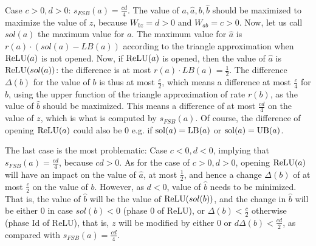 Case $c>0,d>0$: $s_{FSB}(a)=\frac{cd}{4}$.
The value of $a,\hat{a},b,\hat{b}$ should be maximized to maximize the value of $z$, because $W_{bz}=d>0$ and $W_{ab}=c>0$. 
Now, let us call $sol(a)$ the maximum value for $a$.
The maximum value for $\hat{a}$ is $r(a)\cdot (sol(a)-LB(a))$ according to the triangle approximation when $\mathrm{ReLU}(a)$ is not opened. Now, if $\mathrm{ReLU}(a)$ is opened, then 
the value of $\hat{a}$ is $\mathrm{ReLU}(sol(a))$: the difference is at most $r(a) \cdot LB(a) = \frac{1}{2}$. The difference $\Delta(b)$ for the value of $b$ is thus at most $\frac{c}{2}$, which means a difference at most $\frac{c}{4}$ for $\hat{b}$, using the upper function of the triangle approximation of rate $r(b)$, as the value of $\hat{b}$ should be maximized.
This means a difference of at most $\frac{cd}{4}$ on the value of $z$, which is what is computed by $s_{FSB}(a)$. Of course, the difference of opening $\mathrm{ReLU}(a)$ could also be 0 e.g. if $\mathrm{sol}(a)=\mathrm{LB}(a)$ or $\mathrm{sol}(a)=\mathrm{UB}(a)$.

The last case is the most problematic: 
Case $c<0,d<0$, implying that $s_{FSB}(a)=\frac{cd}{4}$, because $cd >0$.
As for the case of $c>0, d>0$, opening $\mathrm{ReLU}(a)$ will have an impact on the value of $\hat{a}$,
at most $\frac{1}{2}$, and hence a change $\Delta(b)$ of at most $\frac{c}{2}$ on the value of $b$.
However, as $d<0$, value of $\hat{b}$ needs to be minimized. That is, the value of $\hat{b}$ will be the value of $\mathrm{ReLU}(sol(b))$, and the change in $\hat{b}$ will be either 0 in case $sol(b)<0$ (phase 0 of ReLU),
or $\Delta(b)<\frac{c}{2}$ otherwise (phase Id of ReLU), that is, $z$ will be modified by 
either 0 or $d \Delta(b)<\frac{cd}{2}$, as compared with $s_{FSB}(a)=\frac{cd}{4}$.



